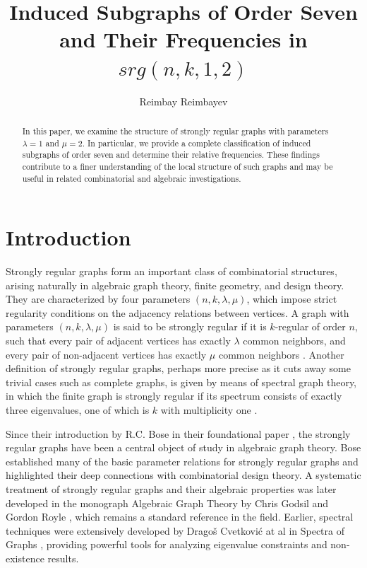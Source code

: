 \documentclass[12pt]{article} %
\title{Induced Subgraphs of Order Seven and Their Frequencies in $srg(n,k,1,2)$}
\author{Reimbay Reimbayev}
\date{} %
\begin{document}
\maketitle

\begin{abstract}
In this paper, we examine the structure of strongly regular graphs with parameters $\lambda = 1$ and $\mu = 2$. In particular, we provide a complete classification of induced subgraphs of order seven and determine their relative frequencies. These findings contribute to a finer understanding of the local structure of such graphs and may be useful in related combinatorial and algebraic investigations.
\end{abstract}



\section{Introduction}

Strongly regular graphs form an important class of combinatorial structures, arising naturally in algebraic graph theory, finite geometry, and design theory. They are characterized by four parameters $(n,k,\lambda,\mu)$, which impose strict regularity conditions on the adjacency relations between vertices. A graph with parameters $(n,k,\lambda,\mu)$ is said to be strongly regular if it is $k$-regular of order $n$, such that every pair of adjacent vertices has exactly $\lambda$ common neighbors, and every pair of non-adjacent vertices has exactly $\mu$ common neighbors \cite{Gordon, Brouwer}. Another definition of strongly regular graphs, perhaps more precise as it cuts away some trivial cases such as complete graphs, is given by means of spectral graph theory, in which the finite graph is strongly regular if its spectrum consists of exactly three eigenvalues, one of which is $k$ with multiplicity one \cite{BrouwerMaldeghem}.

Since their introduction by R.C. Bose in their foundational paper \cite{Bose}, the strongly regular graphs have been a central object of study in algebraic graph theory. Bose established many of the basic parameter relations for strongly regular graphs and highlighted their deep connections with combinatorial design theory. A systematic treatment of strongly regular graphs and their algebraic properties was later developed in the monograph Algebraic Graph Theory by Chris Godsil and Gordon Royle \cite{Godsil}, which remains a standard reference in the field. Earlier, spectral techniques were extensively developed by Dragoš Cvetković at al in Spectra of Graphs \cite{Cvetcovic}, providing powerful tools for analyzing eigenvalue constraints and non-existence results.
\end{document}
